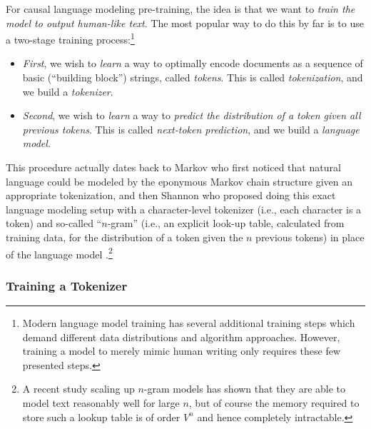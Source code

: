 \documentclass[\toplevelprefix/book-main.tex]{subfiles}
\begin{document}
For causal language modeling pre-training,  the idea is that we want to \textit{train the model to output human-like text}. The most popular way to do this by far is to use a two-stage training process:\footnote{Modern language model training has several additional training steps which demand different data distributions and algorithm approaches. However, training a model to merely mimic human writing only requires these few presented steps.} 
\begin{itemize}
    \item \textit{First}, we wish to \textit{learn} a way to optimally encode documents as a sequence of basic (``building block'') strings, called \textit{tokens}. This is called \textit{tokenization}, and we build a \textit{tokenizer}.
    \item \textit{Second}, we wish to \textit{learn} a way to \textit{predict the distribution of a token given all previous tokens}. This is called \textit{next-token prediction}, and we build a \textit{language model}.
\end{itemize}
 This procedure actually dates back to Markov who first noticed that natural language could be modeled by the eponymous Markov chain structure \citep{markov2006example} given an appropriate tokenization, and then Shannon who proposed doing this exact language modeling setup with a character-level tokenizer (i.e., each character is a token) and so-called  ``\(n\)-gram'' (i.e., an explicit look-up table, calculated from training data, for the distribution of a token given the \(n\) previous tokens) in place of the language model \citep{Shannon-1948}.\footnote{A recent study \citep{liu2024infini} scaling up \(n\)-gram models has shown that they are able to model text reasonably well for large \(n\), but of course the memory required to store such a lookup table is of order \(V^{n}\) and hence completely intractable.}

\subsubsection{Training a Tokenizer}
\end{document}
